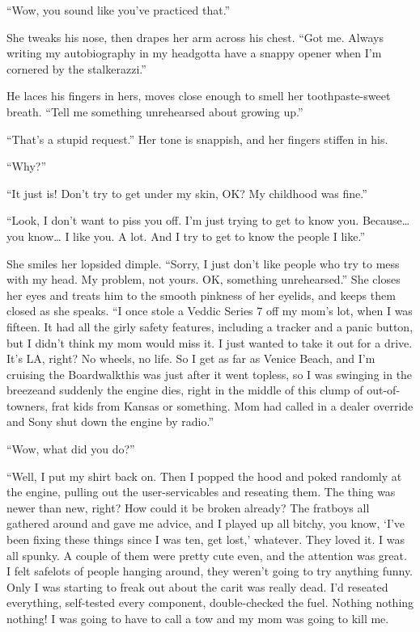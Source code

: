 “Wow, you sound like you’ve practiced that.”

She tweaks his nose, then drapes her arm across his chest. “Got me.
Always writing my autobiography in my head{\dash}gotta have a snappy
open\-er when I’m cornered by the stalkerazzi.”

He laces his fingers in hers, moves close enough to smell her
tooth\-paste-sweet breath. “Tell me something unrehearsed about
growing up.”

“That’s a stupid request.” Her tone is snappish, and her fingers
stiffen in his.

“Why?”

“It just is! Don’t try to get under my skin, OK? My childhood was
fine.”

“Look, I don’t want to piss you off. I’m just trying to get to know
you. Because\ldots{} you know\ldots{} I like you. A lot. And I try to get to
know the people I like.”

She smiles her lopsided dimple. “Sorry, I just don’t like people
who try to mess with my head. My problem, not yours. OK, something
unrehearsed.” She closes her eyes and treats him to the smooth
pinkness of her eyelids, and keeps them closed as she speaks. “I
once stole a Veddic Series 7 off my mom’s lot, when I was fifteen.
It had all the girly safety features, including a tracker and a
panic button, but I didn’t think my mom would miss it. I just
wanted to take it out for a drive. It’s LA, right? No wheels, no
life. So I get as far as Venice Beach, and I’m cruising the
Boardwalk{\dash}this was just after it went topless, so I was swinging in
the breeze{\dash}and suddenly the engine dies, right in the middle of
this clump of out-of-towners, frat kids from Kansas or something.
Mom had called in a dealer override and Sony shut down the engine
by radio.”

“Wow, what did you do?”

“Well, I put my shirt back on. Then I popped the hood and poked
randomly at the engine, pulling out the user-servicables and
reseating them. The thing was newer than new, right? How could it
be broken already? The fratboys all gathered around and gave me
advice, and I played up all bitchy, you know, ‘I’ve been fixing
these things since I was ten, get lost,’ whatever. They loved it. I
was all spunky. A couple of them were pretty cute even, and the
attention was great. I felt safe{\dash}lots of people hanging around,
they weren’t going to try anything funny. Only I was starting to
freak out about the car{\dash}it was really dead. I’d reseated
everything, self-tested every component, double-checked the fuel.
Nothing nothing nothing! I was going to have to call a tow and my
mom was going to kill me.

